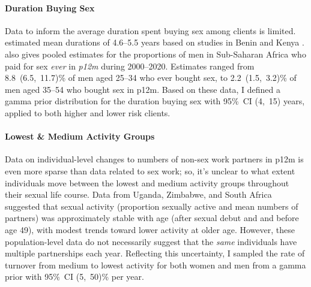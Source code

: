 \paragraph{Duration Buying Sex}
Data to inform the average duration spent buying sex among clients is limited.
\citet{Fazito2012} estimated mean durations of 4.6--5.5 years
based on studies in Benin \cite{Lowndes2000} and Kenya \cite{Voeten2002}.
\citet[Table~G]{Hodgins2022} also gives pooled estimates for
the proportions of men in Sub-Saharan Africa
who paid for sex \emph{ever} \vs in \emph{p12m} during 2000--2020.
Estimates ranged from 8.8~(6.5,~11.7)\% of men aged 25--34 who ever bought sex,
to 2.2~(1.5,~3.2)\% of men aged 35--54 who bought sex in p12m.
Based on these data, I defined a gamma prior distribution for the duration buying sex
with 95\%~CI (4,~15) years, applied to both higher and lower risk clients.
\paragraph{Lowest \& Medium Activity Groups}
Data on individual-level changes to numbers of non-sex work partners in p12m
is even more sparse than data related to sex work;
so, it's unclear to what extent individuals move between the lowest and medium activity groups
throughout their sexual life course.
Data from Uganda, Zimbabwe, and South Africa \cite{Todd2009}
suggested that sexual activity (proportion sexually active and mean numbers of partners)
was approximately stable with age (after sexual debut and and before age 49),
with modest trends toward lower activity at older age.
However, these population-level data do not necessarily suggest that
the \emph{same} individuals have multiple partnerships each year.
Reflecting this uncertainty, I sampled
the rate of turnover from medium to lowest activity for both women and men
from a gamma prior with 95\%~CI (5,~50)\% per year.
